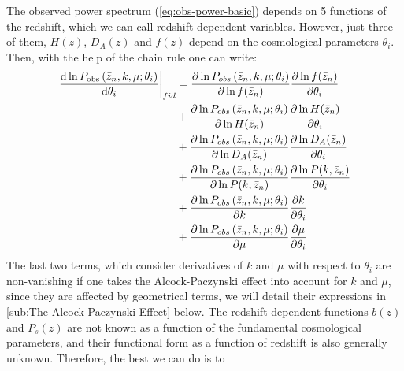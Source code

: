 The observed power spectrum (\cref{eq:obs-power-basic}) depends on 5 functions of the redshift, which we can 
call redshift-dependent variables.
However, just three of them,  $H(z)$, $D_A (z)$ and $f(z)$ depend on the cosmological parameters
$\theta_i$.
Then, with the help of the chain rule one can write:
\begin{align}\label{eq:derivatives-of-lnPobs} 
\left.\frac{\mbox{d}\ln P_{{\rm obs}}\left(\bar{z}_n,k,\mu;\theta_{i}\right)}{\mbox{d}\theta_{i}}\right|_{fid} 
& =\frac{\partial\ln P_{obs}\left(\bar{z}_n,k,\mu;\theta_{i}\right)}{\partial\ln f(\bar{z}_n)}\frac{\partial\ln f(\bar{z}_n)}{\partial\theta_{i}} \\
& +\frac{\partial\ln P_{obs}\left(\bar{z}_n,k,\mu;\theta_{i}\right)}{\partial\ln H(\bar{z}_n)}\frac{\partial\ln H(\bar{z}_n)}{\partial\theta_{i}} \nonumber \\ 
& +\frac{\partial\ln P_{obs}\left(\bar{z}_n,k,\mu;\theta_{i}\right)}{\partial\ln D_{A}(\bar{z}_n)}\frac{\partial\ln D_{A}(\bar{z}_n)}{\partial\theta_{i}}\nonumber \\
& +\frac{\partial\ln P_{obs}\left(\bar{z}_n,k,\mu;\theta_{i}\right)}{\partial\ln P(k,\bar{z}_n)}\frac{\partial\ln P(k,\bar{z}_n)}{\partial\theta_{i}} \nonumber \\ 
& +\frac{\partial\ln P_{obs}\left(\bar{z}_n,k,\mu;\theta_{i}\right)}{\partial k}\frac{\partial k}{\partial\theta_{i}} \nonumber \\
& +\frac{\partial\ln P_{obs}\left(\bar{z}_n,k,\mu;\theta_{i}\right)}{\partial\mu}\frac{\partial\mu}{\partial\theta_{i}}\nonumber 
\end{align}
The last two terms, which consider derivatives of $k$ and $\mu$ with respect to $\theta_i$ are non-vanishing
if one takes the Alcock-Paczynski effect into account for $k$ and
$\mu$, since they are affected by geometrical terms, we will detail their expressions in \cref{sub:The-Alcock-Paczynski-Effect} below.
The redshift dependent functions $b(z)$ and $P_s (z)$ are not known as a function of the fundamental cosmological parameters,
and their functional form as a function of redshift is also generally unknown. Therefore, the best we can do is to
